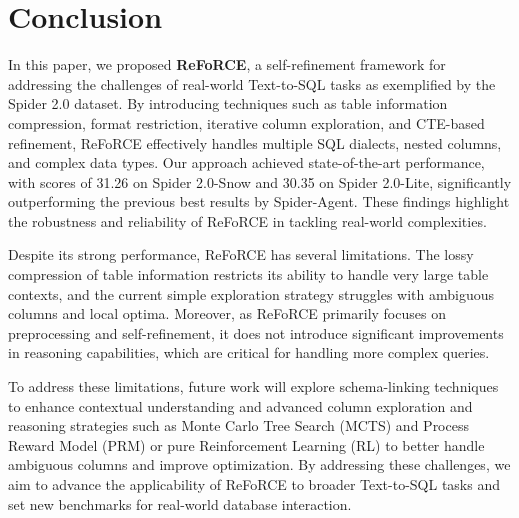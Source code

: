 \section{Conclusion}
In this paper, we proposed \textbf{ReFoRCE}, a self-refinement framework for addressing the challenges of real-world Text-to-SQL tasks as exemplified by the Spider 2.0 dataset. By introducing techniques such as table information compression, format restriction, iterative column exploration, and CTE-based refinement, ReFoRCE effectively handles multiple SQL dialects, nested columns, and complex data types. Our approach achieved state-of-the-art performance, with scores of 31.26 on Spider 2.0-Snow and 30.35 on Spider 2.0-Lite, significantly outperforming the previous best results by Spider-Agent. These findings highlight the robustness and reliability of ReFoRCE in tackling real-world complexities.

Despite its strong performance, ReFoRCE has several limitations. The lossy compression of table information restricts its ability to handle very large table contexts, and the current simple exploration strategy struggles with ambiguous columns and local optima. Moreover, as ReFoRCE primarily focuses on preprocessing and self-refinement, it does not introduce significant improvements in reasoning capabilities, which are critical for handling more complex queries.

To address these limitations, future work will explore schema-linking techniques to enhance contextual understanding and advanced column exploration and reasoning strategies such as Monte Carlo Tree Search (MCTS) and Process Reward Model (PRM) or pure Reinforcement Learning (RL) \citep{guo2025deepseek} to better handle ambiguous columns and improve optimization. By addressing these challenges, we aim to advance the applicability of ReFoRCE to broader Text-to-SQL tasks and set new benchmarks for real-world database interaction.